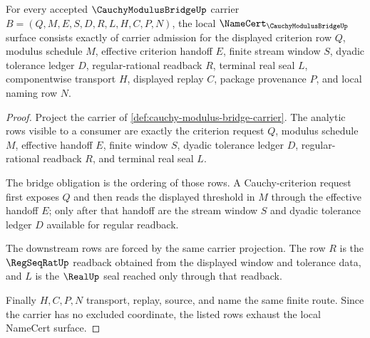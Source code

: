 \begin{theorem}
\label{thm:cauchy-modulus-bridge-namecert-obligations}
For every accepted $\CauchyModulusBridgeUp$ carrier $B=(Q,M,E,S,D,R,L,H,C,P,N)$, the local $\NameCert_{\CauchyModulusBridgeUp}$ surface consists exactly of carrier admission for the displayed criterion row $Q$, modulus schedule $M$, effective criterion handoff $E$, finite stream window $S$, dyadic tolerance ledger $D$, regular-rational readback $R$, terminal real seal $L$, componentwise transport $H$, displayed replay $C$, package provenance $P$, and local naming row $N$.
\end{theorem}
\begin{proof}
Project the carrier of \autoref{def:cauchy-modulus-bridge-carrier}. The analytic rows visible to a consumer are exactly the criterion request $Q$, modulus schedule $M$, effective handoff $E$, finite window $S$, dyadic tolerance ledger $D$, regular-rational readback $R$, and terminal real seal $L$.

The bridge obligation is the ordering of those rows. A Cauchy-criterion request first exposes $Q$ and then reads the displayed threshold in $M$ through the effective handoff $E$; only after that handoff are the stream window $S$ and dyadic tolerance ledger $D$ available for regular readback.

The downstream rows are forced by the same carrier projection. The row $R$ is the $\RegSeqRatUp$ readback obtained from the displayed window and tolerance data, and $L$ is the $\RealUp$ seal reached only through that readback.

Finally $H,C,P,N$ transport, replay, source, and name the same finite route. Since the carrier has no excluded coordinate, the listed rows exhaust the local NameCert surface.
\end{proof}

